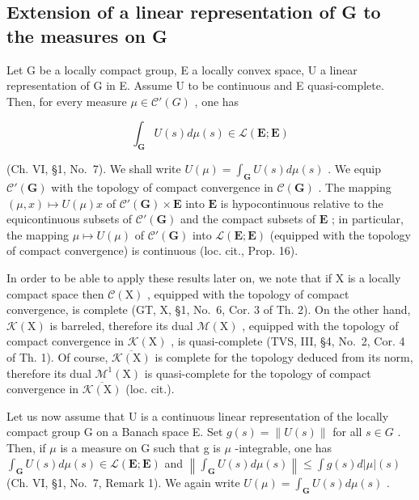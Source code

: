 \subsection{Extension of a linear representation of G to the measures on G}

Let G be a locally compact group, E a locally convex space, U a linear representation of G in E. Assume U to be continuous and E quasi-complete. Then, for every measure \(\mu \in \mathcal{C}'(G)\) , one has

\[
\int_ {\mathbf {G}} U (s) d \mu (s) \in \mathcal {L} (\mathbf {E}; \mathbf {E})
\]

(Ch. VI, §1, No.~7). We shall write \(U(\mu) = \int_{\mathbf{G}} U(s) d\mu(s)\) . We equip \(\mathcal{C}'(\mathbf{G})\) with the topology of compact convergence in \(\mathcal{C}(\mathbf{G})\) . The mapping \((\mu, x) \mapsto U(\mu)x\) of \(\mathcal{C}'(\mathbf{G}) \times \mathbf{E}\) into \(\mathbf{E}\) is hypocontinuous relative to the equicontinuous subsets of \(\mathcal{C}'(\mathbf{G})\) and the compact subsets of \(\mathbf{E}\) ; in particular, the mapping \(\mu \mapsto U(\mu)\) of \(\mathcal{C}'(\mathbf{G})\) into \(\mathcal{L}(\mathbf{E}; \mathbf{E})\) (equipped with the topology of compact convergence) is continuous (loc. cit., Prop. 16).

In order to be able to apply these results later on, we note that if X is a locally compact space then \(\mathcal{C}(\mathrm{X})\) , equipped with the topology of compact convergence, is complete (GT, X, §1, No.~6, Cor. 3 of Th. 2). On the other hand, \(\mathcal{K}(\mathrm{X})\) is barreled, therefore its dual \(\mathcal{M}(\mathrm{X})\) , equipped with the topology of compact convergence in \(\mathcal{K}(\mathrm{X})\) , is quasi-complete (TVS, III, §4, No.~2, Cor. 4 of Th. 1). Of course, \(\overline{\mathcal{K}(\mathrm{X})}\) is complete for the topology deduced from its norm, therefore its dual \(\mathcal{M}^{1}(\mathrm{X})\) is quasi-complete for the topology of compact convergence in \(\overline{\mathcal{K}(\mathrm{X})}\) (loc. cit.).

Let us now assume that U is a continuous linear representation of the locally compact group G on a Banach space E. Set \(g(s) = \|U(s)\|\) for all \(s \in G\) . Then, if \(\mu\) is a measure on G such that g is \(\mu\) -integrable, one has \(\int_{\mathbf{G}} U(s) d\mu(s) \in \mathcal{L}(\mathbf{E}; \mathbf{E})\) and \(\left\|\int_{\mathbf{G}} U(s) d\mu(s)\right\| \leqslant \int g(s) d|\mu|(s)\) (Ch. VI, §1, No.~7, Remark 1). We again write \(U(\mu) = \int_{\mathbf{G}} U(s) d\mu(s)\) .

